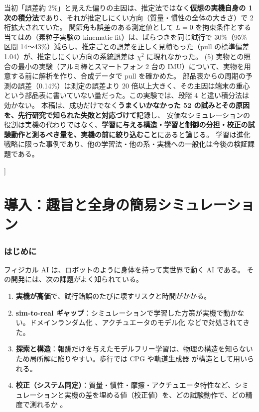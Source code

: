 \documentclass[paper=a4paper,fontsize=10pt,twocolumn,column_gap=2zw,line_length=24zw,number_of_lines=46,head_space=20mm]{jlreq}
\begin{document}
\begin{@twocolumnfalse}
\begin{center}
\begin{minipage}{0.9\textwidth}
当初「誤差約 2\%」と見えた偏りの主因は、推定法ではなく\textbf{仮想の実機自身の 1 次の積分法}であり、それが推定しにくい方向（質量・慣性の全体の大きさ）で 2 桁拡大されていた。
関節角も誤差のある測定値として $L=0$ を拘束条件とする当てはめ（素粒子実験の kinematic fit）は、ばらつきを同じ試行で 30\%（95\% 区間 14〜43\%）減らし、推定ごとの誤差を正しく見積もった（pull の標準偏差 1.04）が、推定しにくい方向の系統誤差は $\chi^2$ に現れなかった。
(5) 実物との照合の最小の実験（アルミ棒とスマートフォン 2 台の IMU）について、実物を用意する前に解析を作り、合成データで pull を確かめた。
部品表からの周期の予測の誤差（0.14\%）は測定の誤差より 20 倍以上大きく、その主因は端末の重心という部品表に書いていない量だった。この実験では、段階 4 と違い積分法は効かない。
本稿は、成功だけでなく\textbf{うまくいかなかった 52 の試みとその原因を、先行研究で知られた失敗と対応づけて}記録し、
安価なシミュレーションの役割は実機の代わりではなく、\textbf{学習に与える構造・学習と制御の分担・校正の試験動作と測るべき量を、実機の前に絞り込むこと}にあると論じる。
学習は進化戦略に限った事例であり、他の学習法・他の系・実機への一般化は今後の検証課題である。
\end{minipage}\end{center}
\vspace{1em}
\end{@twocolumnfalse}
]

\part{導入：趣旨と全身の簡易シミュレーション}

\section{はじめに}\label{sec:intro}

フィジカル AI は、ロボットのように身体を持って実世界で動く AI である。
その開発には、次の課題がよく知られている。
\begin{enumerate}\setlength{\itemsep}{0pt}
\item \textbf{実機が高価}で、試行錯誤のたびに壊すリスクと時間がかかる。
\item \textbf{sim-to-real ギャップ}：シミュレーションで学習した方策が実機で動かない。ドメインランダム化 \cite{tobin2017,peng2018}、アクチュエータのモデル化 \cite{hwangbo2019} などで対処されてきた。
\item \textbf{探索と構造}：報酬だけを与えたモデルフリー学習は、物理の構造を知らないため局所解に陥りやすい。歩行では CPG \cite{ijspeert2008} や軌道生成器 \cite{iscen2018} が構造として用いられる。
\item \textbf{校正（システム同定）}：質量・慣性・摩擦・アクチュエータ特性など、シミュレーションと実機の差を埋める値（校正値）を、どの試験動作で、どの精度で測れるか \cite{atkeson1986,gautier1990}。
\end{enumerate}
\end{document}

